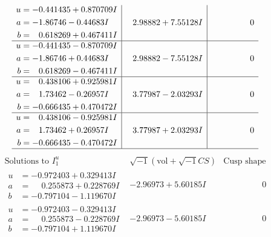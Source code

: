 \documentclass[1p]{elsarticle_modified}
\theoremstyle{definition}
\newcommand{\I}{\sqrt{-1}}
\begin{document}
$$\begin{array}{c|c|c}
\begin{aligned}
u &= -0.441435 + 0.870709 I \\
a &= -1.86746 - 0.44683 I \\
b &= \phantom{-}0.618269 + 0.467411 I\end{aligned}
 & \phantom{-}2.98882 + 7.55128 I & \phantom{-0.000000 } 0 \\ \hline\begin{aligned}
u &= -0.441435 - 0.870709 I \\
a &= -1.86746 + 0.44683 I \\
b &= \phantom{-}0.618269 - 0.467411 I\end{aligned}
 & \phantom{-}2.98882 - 7.55128 I & \phantom{-0.000000 } 0 \\ \hline\begin{aligned}
u &= \phantom{-}0.438106 + 0.925981 I \\
a &= \phantom{-}1.73462 - 0.26957 I \\
b &= -0.666435 + 0.470472 I\end{aligned}
 & \phantom{-}3.77987 - 2.03293 I & \phantom{-0.000000 } 0 \\ \hline\begin{aligned}
u &= \phantom{-}0.438106 - 0.925981 I \\
a &= \phantom{-}1.73462 + 0.26957 I \\
b &= -0.666435 - 0.470472 I\end{aligned}
 & \phantom{-}3.77987 + 2.03293 I & \phantom{-0.000000 } 0\\
 \hline 
 \end{array}$$\newpage$$\begin{array}{c|c|c}  
\text{Solutions to }I^u_{1}& \I (\text{vol} + \sqrt{-1}CS) & \text{Cusp shape}\\
 \hline 
\begin{aligned}
u &= -0.972403 + 0.329413 I \\
a &= \phantom{-}0.255873 + 0.228769 I \\
b &= -0.797104 - 1.119670 I\end{aligned}
 & -2.96973 + 5.60185 I & \phantom{-0.000000 } 0 \\ \hline\begin{aligned}
u &= -0.972403 - 0.329413 I \\
a &= \phantom{-}0.255873 - 0.228769 I \\
b &= -0.797104 + 1.119670 I\end{aligned}
 & -2.96973 - 5.60185 I & \phantom{-0.000000 } 0 \\ \hline\begin{aligned}

\end{aligned}
\end{array}$$
\end{document}
